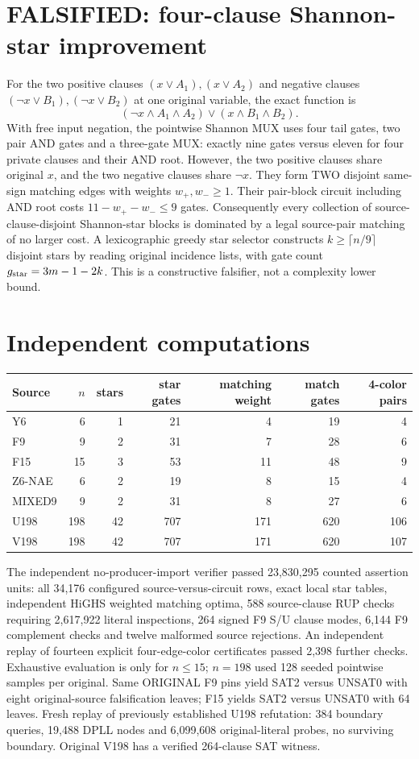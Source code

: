 \documentclass[11pt]{article}
\begin{document}
\section*{FALSIFIED: four-clause Shannon-star improvement}
For the two positive clauses $(x\vee A_1),(x\vee A_2)$ and negative clauses $(\neg x\vee B_1),(\neg x\vee B_2)$ at one original variable, the exact function is
\[
(\neg x\wedge A_1\wedge A_2)\vee(x\wedge B_1\wedge B_2).
\]
With free input negation, the pointwise Shannon MUX uses four tail gates, two pair AND gates and a three-gate MUX: exactly nine gates versus eleven for four private clauses and their AND root. However, the two positive clauses share original $x$, and the two negative clauses share $\neg x$. They form TWO disjoint same-sign matching edges with weights $w_+,w_-\geq1$. Their pair-block circuit including AND root costs $11-w_+-w_-\leq9$ gates. Consequently every collection of source-clause-disjoint Shannon-star blocks is dominated by a legal source-pair matching of no larger cost. A lexicographic greedy star selector constructs $k\geq\lceil n/9\rceil$ disjoint stars by reading original incidence lists, with gate count $g_{\rm star}=3m-1-2k$. This is a constructive falsifier, not a complexity lower bound.

\section*{Independent computations}
\begin{center}\small
\begin{tabular}{lrrrrrr}\toprule
Source&$n$&stars&star gates&matching weight&match gates&4-color pairs\\\midrule
Y6&6&1&21&4&19&4\\
F9&9&2&31&7&28&6\\
F15&15&3&53&11&48&9\\
Z6-NAE&6&2&19&8&15&4\\
MIXED9&9&2&31&8&27&6\\
U198&198&42&707&171&620&106\\
V198&198&42&707&171&620&107\\\bottomrule
\end{tabular}
\end{center}
The independent no-producer-import verifier passed 23,830,295 counted assertion units: all 34,176 configured source-versus-circuit rows, exact local star tables, independent HiGHS weighted matching optima, 588 source-clause RUP checks requiring 2,617,922 literal inspections, 264 signed F9 S/U clause modes, 6,144 F9 complement checks and twelve malformed source rejections. An independent replay of fourteen explicit four-edge-color certificates passed 2,398 further checks. Exhaustive evaluation is only for $n\leq15$; $n=198$ used 128 seeded pointwise samples per original. Same ORIGINAL F9 pins yield SAT2 versus UNSAT0 with eight original-source falsification leaves; F15 yields SAT2 versus UNSAT0 with 64 leaves. Fresh replay of previously established U198 refutation: 384 boundary queries, 19,488 DPLL nodes and 6,099,608 original-literal probes, no surviving boundary. Original V198 has a verified 264-clause SAT witness.
\end{document}
